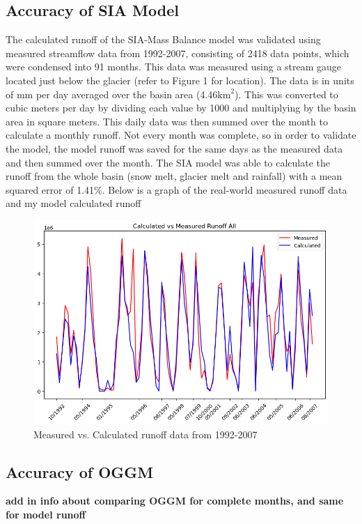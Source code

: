 \documentclass{article}
\begin{document}
\subsection{Accuracy of SIA Model}
The calculated runoff of the SIA-Mass Balance model was validated using measured streamflow data from 1992-2007, consisting of 2418 
data points, which were condensed into 91 months. This data was measured using 
a stream gauge located just below the glacier (refer to Figure 1 for location). The data is in units of mm per day averaged over the basin area (4.46$\text{km}^2$). This was  
converted to cubic meters per day by dividing each value by 1000 and multiplying by the basin area in square meters. This daily data was then 
summed over the month to calculate a monthly runoff. Not every month was complete, so in order to validate the model, the model runoff was saved 
for the same days as the measured data and then summed over the month. The SIA model was able to 
calculate the runoff from the whole basin (snow melt, glacier melt and rainfall) with a mean squared error of 1.41\%.
Below is a graph of the real-world measured runoff data and my model calculated runoff
\begin{figure}[h!]
    \centering
    \includegraphics[width=\textwidth]{Plots/calc_vs_measured.png}
    \caption{Measured vs. Calculated runoff data from 1992-2007}
    \label{fig:calc_vs_measured}
\end{figure}
\FloatBarrier
\subsection{Accuracy of OGGM}
\textbf{add in info about comparing OGGM for complete months, and same for model runoff}
\end{document}
